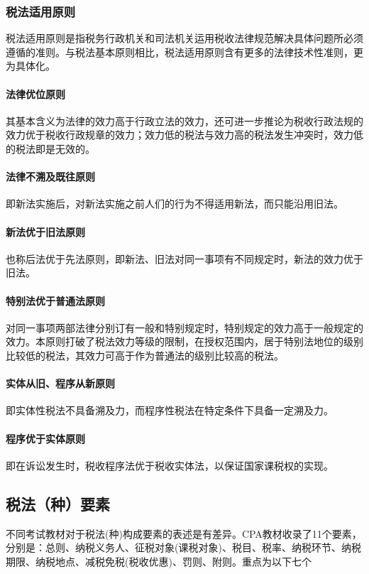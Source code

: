 \documentclass[UTF8,12pt]{ctexart}
\numberwithin{equation}{section} %
\numberwithin{figure}{section}
\numberwithin{table}{section}
\begin{document}
	
	\subsubsection{税法适用原则}
	税法适用原则是指税务行政机关和司法机关运用税收法律规范解决具体问题所必须遵循的准则。与税法基本原则相比，税法适用原则含有更多的法律技术性准则，更为具体化。
	
	\paragraph{法律优位原则}其基本含义为法律的效力高于行政立法的效力，还可进一步推论为税收行政法规的效力优于税收行政规章的效力；效力低的税法与效力高的税法发生冲突时，效力低的税法即是无效的。
	
	\paragraph{法律不溯及既往原则}即新法实施后，对新法实施之前人们的行为不得适用新法，而只能沿用旧法。
	
	\paragraph{新法优于旧法原则}也称后法优于先法原则，即新法、旧法对同一事项有不同规定时，新法的效力优于旧法。
	
	\paragraph{特别法优于普通法原则}对同一事项两部法律分别订有一般和特别规定时，特别规定的效力高于一般规定的效力。本原则打破了税法效力等级的限制，在授权范围内，居于特别法地位的级别比较低的税法，其效力可高于作为普通法的级别比较高的税法。
	
	\paragraph{实体从旧、程序从新原则}即实体性税法不具备溯及力，而程序性税法在特定条件下具备一定溯及力。
	
	\paragraph{程序优于实体原则}即在诉讼发生时，税收程序法优于税收实体法，以保证国家课税权的实现。
	
	\subsection{税法（种）要素}
	不同考试教材对于税法(种)构成要素的表述是有差异。CPA教材收录了11个要素，分别是：总则、纳税义务人、征税对象(课税对象)、税目、税率、纳税环节、纳税期限、纳税地点、减税免税(税收优惠)、罚则、附则。重点为以下七个
	
\end{document}
